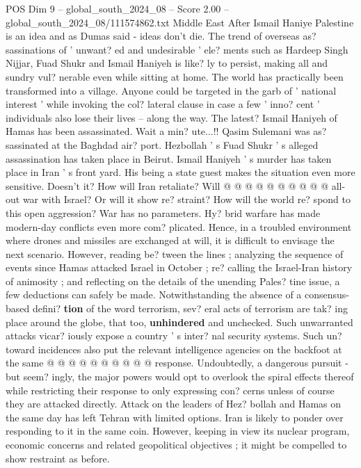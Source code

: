 \begin{textsample}{POS Dim 9 – global\_south\_2024\_08 – Score 2.00 – global\_south\_2024\_08/111574862.txt}  \label{ex:f9_pos_115}
Middle East After Ismail Haniye Palestine is an idea and as Dumas said - ideas don't die.
The trend of overseas as? sassinations of ' unwant? ed and undesirable ' ele? ments such as Hardeep Singh Nijjar, Fuad Shukr and Ismail Haniyeh is like? ly to persist, making all and sundry vul? nerable even while sitting at home.
The world has practically been transformed into a village.
Anyone could be targeted in the garb of ' national interest ' while invoking the col? lateral clause in case a few ' inno? cent ' individuals also lose their lives -- along the way.
The latest?
Ismail Haniyeh of Hamas has been assassinated.
Wait a min? ute...!!
Qasim Sulemani was as? sassinated at the Baghdad air? port.
Hezbollah ' s Fuad Shukr ' s alleged assassination has taken place in Beirut.
Ismail Haniyeh ' s murder has taken place in Iran ' s front yard.
His being a state guest makes the situation even more sensitive.
Doesn't it?
How will Iran retaliate?
Will @ @ @ @ @ @ @ @ @ @ all-out war with Israel?
Or will it show re? straint?
How will the world re? spond to this open aggression?
War has no parameters.
Hy? brid warfare has made modern-day conflicts even more com? plicated.
Hence, in a troubled environment where drones and missiles are exchanged at will, it is difficult to envisage the next scenario.
However, reading be? tween the lines ; analyzing the sequence of events since Hamas attacked Israel in October ; re? calling the Israel-Iran history of animosity ; and reflecting on the details of the unending Pales? tine issue, a few deductions can safely be made.
Notwithstanding the absence of a consensus-based defini? \textbf{tion} of the word terrorism, sev? eral acts of terrorism are tak? ing place around the globe, that too, \textbf{unhindered} and unchecked.
Such unwarranted attacks vicar? iously expose a country ' s inter? nal security systems.
Such un? toward incidences also put the relevant intelligence agencies on the backfoot at the same @ @ @ @ @ @ @ @ @ @ response.
Undoubtedly, a dangerous pursuit - but seem? ingly, the major powers would opt to overlook the spiral effects thereof while restricting their response to only expressing con? cerns unless of course they are attacked directly.
Attack on the leaders of Hez? bollah and Hamas on the same day has left Tehran with limited options.
Iran is likely to ponder over responding to it in the same coin.
However, keeping in view its nuclear program, economic concerns and related geopolitical objectives ; it might be compelled to show restraint as before.

\end{textsample}
